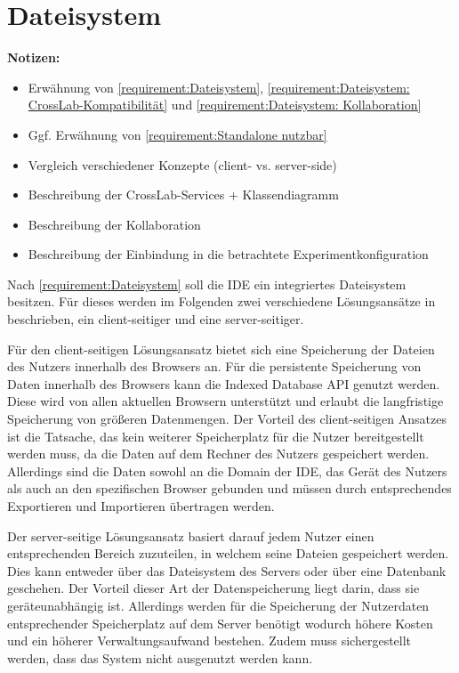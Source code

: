 \section{Dateisystem}\label{section:konzeption:dateisystem}

\begin{note}
    \textbf{Notizen:}
    \begin{itemize}
        \item Erwähnung von \autoref{requirement:Dateisystem}, \autoref{requirement:Dateisystem: CrossLab-Kompatibilität} und \autoref{requirement:Dateisystem: Kollaboration}
        \item Ggf. Erwähnung von \autoref{requirement:Standalone nutzbar}
        \item Vergleich verschiedener Konzepte (client- vs. server-side)
        \item Beschreibung der CrossLab-Services + Klassendiagramm
        \item Beschreibung der Kollaboration
        \item Beschreibung der Einbindung in die betrachtete Experimentkonfiguration
    \end{itemize}
\end{note}

Nach \autoref{requirement:Dateisystem} soll die IDE ein integriertes Dateisystem besitzen. Für dieses werden im Folgenden zwei verschiedene Lösungsansätze in beschrieben, ein client-seitiger und eine server-seitiger.

Für den client-seitigen Lösungsansatz bietet sich eine Speicherung der Dateien des Nutzers innerhalb des Browsers an. Für die persistente Speicherung von Daten innerhalb des Browsers kann die Indexed Database API \cite{noauthor_indexed-database-api_nodate} genutzt werden. Diese wird von allen aktuellen Browsern unterstützt und erlaubt die langfristige Speicherung von größeren Datenmengen. Der Vorteil des client-seitigen Ansatzes ist die Tatsache, das kein weiterer Speicherplatz für die Nutzer bereitgestellt werden muss, da die Daten auf dem Rechner des Nutzers gespeichert werden. Allerdings sind die Daten sowohl an die Domain der IDE, das Gerät des Nutzers als auch an den spezifischen Browser gebunden und müssen durch entsprechendes Exportieren und Importieren übertragen werden.

Der server-seitige Lösungsansatz basiert darauf jedem Nutzer einen entsprechenden Bereich zuzuteilen, in welchem seine Dateien gespeichert werden. Dies kann entweder über das Dateisystem des Servers oder über eine Datenbank geschehen. Der Vorteil dieser Art der Datenspeicherung liegt darin, dass sie geräteunabhängig ist. Allerdings werden für die Speicherung der Nutzerdaten entsprechender Speicherplatz auf dem Server benötigt wodurch höhere Kosten und ein höherer Verwaltungsaufwand bestehen. Zudem muss sichergestellt werden, dass das System nicht ausgenutzt werden kann.

